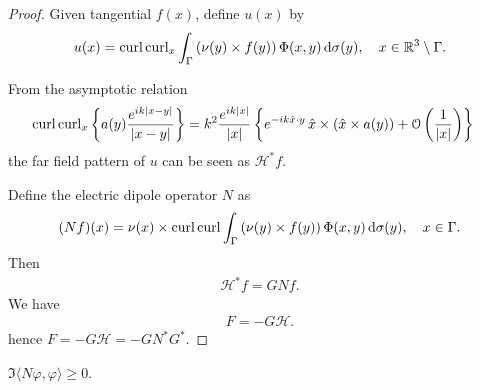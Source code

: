 \begin{proof}
  Given tangential $f(x)$, define $u(x)$ by
  \begin{align*}
    u(x) = \operatorname{curl}\operatorname{curl}_x\int_{\Gamma}\left(\nu(y)\times f(y)\right)\Phi(x,y)\,\text{d}\sigma(y),\quad x\in\mathbb{R}^3\setminus\Gamma.
  \end{align*}
  
  From the asymptotic relation
  \begin{align*}
    \operatorname{curl}\operatorname{curl}_x\left\{a(y)\frac{e^{ik|x-y|}}{|x-y|}\right\} &= k^2\frac{e^{ik|x|}}{|x|}\left\{e^{-ik\hat{x}\cdot y}\,\hat{x}\times(\hat{x}\times a(y)) + \mathcal{O}\left(\frac{1}{|x|}\right)\right\} 
  \end{align*}
  the far field pattern of $u$ can be seen as $\mathcal{H}^*f$. 

  Define the electric dipole operator $N$ as %
  \begin{align}
    (Nf)(x) = \nu(x)\times\operatorname{curl}\operatorname{curl}\int_{\Gamma}\left(\nu(y)\times f(y)\right)\Phi(x,y)\,\text{d}\sigma(y),\quad x\in\Gamma.
  \end{align}
  Then
  \begin{align}
    \mathcal{H}^*f = GNf.
  \end{align}
  We have
  \begin{align}
    F=-G\mathcal{H}.
  \end{align}
  hence $F=-G\mathcal{H}=-GN^*G^*$.
\end{proof}

\begin{prp}
$\Im\langle N\varphi, \varphi\rangle\geqslant 0$. 
\end{prp}

